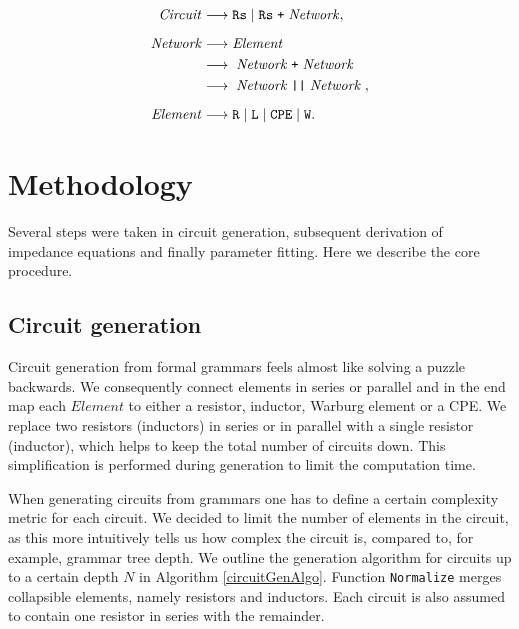 \documentclass[
    11pt,
    a4paper,
    oneside
]{article}
\newcommand{\nt}[1]{\mathit{#1}}
\newcommand{\term}[1]{\text{\texttt{#1}}}
\begin{document}
\begin{equation}
\label{eq:grammar-relaxed}
\begin{aligned}
\nt{Circuit}
    &\longrightarrow
    \term{Rs}
    \mid
    \term{Rs}\;\term{+}\;\nt{Network},
    \\[2mm]
\nt{Network}
    &\longrightarrow
    \nt{Element}
    \\%
    &\longrightarrow\;\nt{Network}\;\term{+}\;\nt{Network}\;
    \\
    &\longrightarrow%
    \;\nt{Network}\;\term{||}\;\nt{Network}\;,
    \\[2mm]
\nt{Element}
    &\longrightarrow
    \term{R}
    \mid \term{L}
    \mid \term{CPE}
    \mid \term{W}.
\end{aligned}
\end{equation}

\section{Methodology}

Several steps were taken in circuit generation, subsequent derivation of impedance equations and finally parameter fitting.
Here we describe the core procedure.

\subsection{Circuit generation}\label{circuit_gen}

Circuit generation from formal grammars feels almost like solving a puzzle backwards. We consequently connect elements in series or parallel
and in the end map each $\nt{Element}$ to either a resistor, inductor, Warburg element or a CPE. We replace two resistors (inductors) in series or in parallel with a single resistor (inductor),
which helps to keep the total number of circuits down. This simplification is performed during generation to limit the computation time.

When generating circuits from grammars one has to define a certain complexity metric for each circuit. We decided to limit the number of elements in the circuit, as this more intuitively 
tells us how complex the circuit is, compared to, for example, grammar tree depth. We outline the generation algorithm for circuits up to a certain depth $N$ in Algorithm \ref{circuitGenAlgo}.
Function \texttt{Normalize} merges collapsible elements, namely resistors and inductors. Each circuit is also assumed to contain one resistor in series with the remainder.
\end{document}
